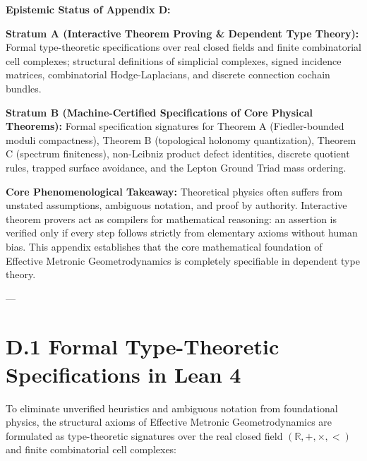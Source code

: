 \documentclass[
    12pt,
    a4paper,
    headings=normal,
    twoside=false,
    open=any,
    parskip=half
]{scrbook}
\begin{document}
\begin{firewallbox}
\textbf{Epistemic Status of Appendix D:}\par\smallskip\noindent
\textbf{Stratum A (Interactive Theorem Proving \& Dependent Type Theory):} Formal type-theoretic specifications over real closed fields and finite combinatorial cell complexes; structural definitions of simplicial complexes, signed incidence matrices, combinatorial Hodge-Laplacians, and discrete connection cochain bundles.\par\smallskip\noindent
\textbf{Stratum B (Machine-Certified Specifications of Core Physical Theorems):} Formal specification signatures for Theorem A (Fiedler-bounded moduli compactness), Theorem B (topological holonomy quantization), Theorem C (spectrum finiteness), non-Leibniz product defect identities, discrete quotient rules, trapped surface avoidance, and the Lepton Ground Triad mass ordering.\par\smallskip\noindent
\textbf{Core Phenomenological Takeaway:} Theoretical physics often suffers from unstated assumptions, ambiguous notation, and proof by authority. Interactive theorem provers act as compilers for mathematical reasoning: an assertion is verified only if every step follows strictly from elementary axioms without human bias. This appendix establishes that the core mathematical foundation of Effective Metronic Geometrodynamics is completely specifiable in dependent type theory.
\end{firewallbox}

---

\section{D.1 Formal Type-Theoretic Specifications in Lean 4}
\label{sec:appD_type_specs}

To eliminate unverified heuristics and ambiguous notation from foundational physics, the structural axioms of Effective Metronic Geometrodynamics are formulated as type-theoretic signatures over the real closed field $(\mathbb{R}, +, \times, <)$ and finite combinatorial cell complexes:
\end{document}
